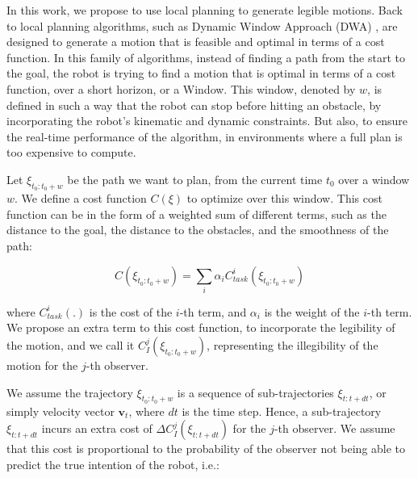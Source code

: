 \vsapce{~}

In this work, we propose to use local planning to generate legible motions.
Back to local planning algorithms, such as Dynamic Window Approach (DWA) \cite{DWA1997}, are designed to generate a motion that is feasible and optimal in terms of a cost function.
%
In this family of algorithms, instead of finding a path from the start to the goal,
the robot is trying to find a motion that is optimal in terms of a cost function, over a short horizon, or a Window.
This window, denoted by $w$, is defined in such a way that the robot can stop before hitting an obstacle,
by incorporating the robot's kinematic and dynamic constraints.
But also, to ensure the real-time performance of the algorithm, in environments where a full plan is too expensive to compute.

Let $\xi_{t_0:t_0+w}$ be the path we want to plan, from the current time $t_0$ over a window $w$.
We define a cost function
$C(\xi)$
to optimize over this window.
This cost function can be in the form of a weighted sum of different terms, such as the distance to the goal, the distance to the obstacles, and the smoothness of the path:

\begin{equation}
    \label{eq:cost_general}
    C(\xi_{t_0:t_0+w}) = \sum_i \alpha_i C_{task}^i(\xi_{t_0:t_0+w})
\end{equation}

\noindent
where $C_{task}^i(.)$ is the cost of the $i$-th term, and $\alpha_i$ is the weight of the $i$-th term.
%
We propose an extra term to this cost function, to incorporate the legibility of the motion,
and we call it $C_{I}^j(\xi_{t_0:t_0+w})$, representing the illegibility of the motion for the $j$-th observer.


We assume the trajectory $\xi_{t_0:t_0+w}$ is a sequence of sub-trajectories $\xi_{t:t+dt}$, or simply velocity vector $\mathbf{v}_t$, where $dt$ is the time step.
Hence, a sub-trajectory $\xi_{t:t+dt}$ incurs an extra cost of $\Delta C_{I}^j(\xi_{t:t+dt})$ for the $j$-th observer.
We assume that this cost is proportional to the probability of the observer not being able to predict the true intention of the robot, i.e.:

